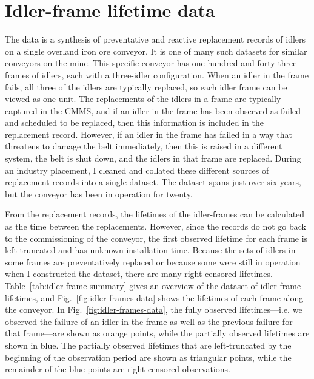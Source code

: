 \section{Idler-frame lifetime data} \label{sec:idler-frame-data-desc}

The data is a synthesis of preventative and reactive replacement records of idlers on a single overland iron ore conveyor. It is one of many such datasets for similar conveyors on the mine. This specific conveyor has one hundred and forty-three frames of idlers, each with a three-idler configuration. When an idler in the frame fails, all three of the idlers are typically replaced, so each idler frame can be viewed as one unit. The replacements of the idlers in a frame are typically captured in the CMMS, and if an idler in the frame has been observed as failed and scheduled to be replaced, then this information is included in the replacement record. However, if an idler in the frame has failed in a way that threatens to damage the belt immediately, then this is raised in a different system, the belt is shut down, and the idlers in that frame are replaced. During an industry placement, I cleaned and collated these different sources of replacement records into a single dataset. The dataset spans just over six years, but the conveyor has been in operation for twenty.

From the replacement records, the lifetimes of the idler-frames can be calculated as the time between the replacements. However, since the records do not go back to the commissioning of the conveyor, the first observed lifetime for each frame is left truncated and has unknown installation time. Because the sets of idlers in some frames are preventatively replaced or because some were still in operation when I constructed the dataset, there are many right censored lifetimes. Table~\ref{tab:idler-frame-summary} gives an overview of the dataset of idler frame lifetimes, and Fig.~\ref{fig:idler-frames-data} shows the lifetimes of each frame along the conveyor. In Fig.~\ref{fig:idler-frames-data}, the fully observed lifetimes---i.e. we observed the failure of an idler in the frame as well as the previous failure for that frame---are shown as orange points, while the partially observed lifetimes are shown in blue. The partially observed lifetimes that are left-truncated by the beginning of the observation period are shown as triangular points, while the remainder of the blue points are right-censored observations.



